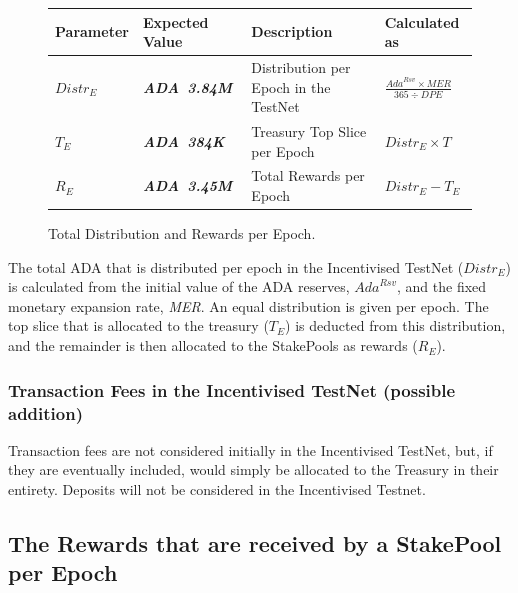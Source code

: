 \documentclass[11pt,a4paper,dvipsnames,twosided,final]{article}
\newcommand{\ada}{ADA{}}
\newcommand{\ADA}[1]{\textbf{\emph{\ada~{#1}}}}
\begin{document}
\begin{figure}[h!]
\begin{center}
\begin{tabular}{||l|l|p{6cm}|l||}
  \hline \hline
\textbf{Parameter} & \textbf{Expected Value} & \textbf{Description} & \textbf{Calculated as} \\\hline
$\textit{Distr}_E$ & \ADA{3.84M} & Distribution per Epoch in the TestNet & $\frac{\textit{Ada}^{\textit{Rsv}} \times \textit{MER}}{365 \div \textit{DPE}}$ \\\hline
$T_E$ & \ADA{384K} & Treasury Top Slice per Epoch & $\textit{Distr}_E \times T$ \\\hline
$R_E$ & \ADA{3.45M} & Total Rewards per Epoch & $\textit{Distr}_E - T_E$ \\\hline
  \hline
\end{tabular}
\end{center}
\caption{Total Distribution and Rewards per Epoch.}
\label{fig:distrib}
\end{figure}

\noindent
The total \ada{} that is distributed per epoch in the Incentivised TestNet (${\textit{Distr}}_E$) is calculated from the initial
value of the \ada{} reserves, $\textit{Ada}^{\textit{Rsv}}$, and the fixed monetary expansion rate, \textit{MER}.
An equal distribution is given per epoch.  The top slice that is allocated to the treasury ($T_E$) is
deducted from this distribution, and the remainder is then allocated to the StakePools as rewards ($R_E$).

\subsubsection*{Transaction Fees in the Incentivised TestNet (possible addition)}

Transaction fees are not considered initially in the Incentivised TestNet, but, if they are eventually included, would simply be allocated to
the Treasury in their entirety. Deposits will not be considered in the Incentivised Testnet.

\subsection{The Rewards that are received by a StakePool per Epoch}
\end{document}
